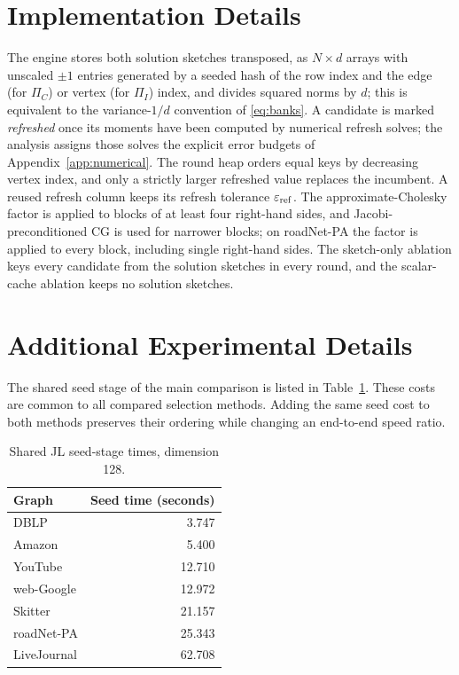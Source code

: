 \section{Implementation Details}\label{app:implementation}
The engine stores both solution sketches transposed, as $N\times d$ arrays with
unscaled $\pm1$ entries generated by a seeded hash of the row index
and the edge (for $\Pi_C$) or vertex (for $\Pi_I$) index, and divides squared norms by $d$; this is equivalent to
the variance-$1/d$ convention of \eqref{eq:banks}. A candidate is
marked \emph{refreshed} once its moments have been computed by numerical
refresh solves; the analysis assigns those solves the explicit error
budgets of Appendix~\ref{app:numerical}. The round heap orders equal
keys by decreasing vertex index, and only a strictly larger refreshed
value replaces the incumbent. A reused refresh column keeps its
refresh tolerance $\varepsilon_{\rm ref}$. The approximate-Cholesky factor is applied
to blocks of at least four right-hand sides, and Jacobi-preconditioned
CG is used for narrower blocks; on roadNet-PA the factor is applied to
every block, including single right-hand sides. The sketch-only
ablation keys every candidate from the solution sketches in every round, and the
scalar-cache ablation keeps no solution sketches.

\clearpage
\section{Additional Experimental Details}\label{app:extraresults}

The shared seed stage of the main comparison is listed in
Table~\ref{tab:seeds}. These costs are common to all compared
selection methods. Adding the same seed cost to both methods
preserves their ordering while changing an end-to-end speed ratio.

\begin{table}[H]
\centering\footnotesize
\caption{Shared JL seed-stage times, dimension 128.}
\label{tab:seeds}
\begin{tabular}{@{}lr@{}}\toprule
Graph & Seed time (seconds)\\\midrule
DBLP & 3.747\\
Amazon & 5.400\\
YouTube & 12.710\\
web-Google & 12.972\\
Skitter & 21.157\\
roadNet-PA & 25.343\\
LiveJournal & 62.708\\
\bottomrule\end{tabular}
\end{table}

